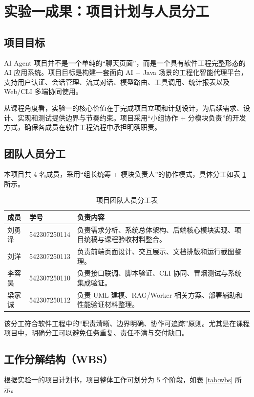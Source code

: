 \documentclass[12pt,a4paper,UTF8]{ctexart}
\begin{document}
\section{实验一成果：项目计划与人员分工}

\subsection{项目目标}
AI Agent 项目并不是一个单纯的“聊天页面”，而是一个具有软件工程完整形态的 AI 应用系统。项目目标是构建一套面向 AI + Java 场景的工程化智能代理平台，支持用户认证、会话管理、流式对话、模型路由、工具调用、统计报表以及 Web/CLI 多端协同使用。

从课程角度看，实验一的核心价值在于完成项目立项和计划设计，为后续需求、设计、实现和测试提供边界与节奏约束。项目采用“小组协作 + 分模块负责”的开发方式，确保各成员在软件工程流程中承担明确职责。

\subsection{团队人员分工}
本项目共 4 名成员，采用“组长统筹 + 模块负责人”的协作模式，具体分工如表 \ref{tab:team-division} 所示。

\begin{table}[H]
    \centering
    \caption{项目团队人员分工表}
    \label{tab:team-division}
    \begin{tabular}{p{1.8cm}p{2.5cm}p{7.2cm}}
        \toprule
        成员 & 学号 & 负责内容 \\
        \midrule
        刘勇泽 & 542307250114 & 负责需求分析、系统总体架构、后端核心模块实现、项目统稿与课程验收材料整合。 \\
        刘洋 & 542307250113 & 负责前端页面设计、交互展示、文档排版和运行截图整理。 \\
        李容昊 & 542307250110 & 负责接口联调、脚本验证、CLI 协同、冒烟测试与系统集成验证。 \\
        梁家诚 & 542307250112 & 负责 UML 建模、RAG/Worker 相关方案、部署辅助和性能验证材料整理。 \\
        \bottomrule
    \end{tabular}
\end{table}

该分工符合软件工程中的“职责清晰、边界明确、协作可追踪”原则。尤其是在课程项目中，明确分工可以避免任务重复、责任不清与交付缺口。

\subsection{工作分解结构（WBS）}
根据实验一的项目计划书，项目整体工作可划分为 5 个阶段，如表 \ref{tab:wbs} 所示。
\end{document}
